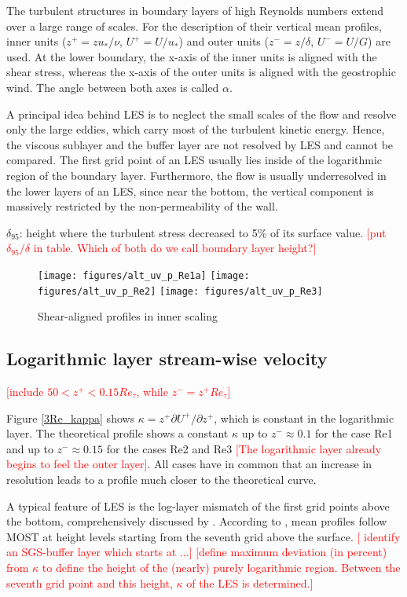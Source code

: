 \documentclass[a4paper,11pt]{article}
\newcommand{\todo}[1]{\textcolor{red}{$[$#1$]$}}
\begin{document}
The turbulent structures in boundary layers of high Reynolds numbers extend over a large range of scales. For the description of their vertical mean profiles, inner units ($z^+ = zu_*/\nu$, $U^+=U/u_*$) and outer units ($z^-=z/\delta$, $U^-=U/G$) are used. At the lower boundary, the x-axis of the inner units is aligned with the shear stress, whereas the x-axis of the outer units is aligned with the geostrophic wind. The angle between both axes is called $\alpha$.

A principal idea behind LES is to neglect the small scales of the flow and resolve only the large eddies, which carry most of the turbulent kinetic energy. Hence, the viscous sublayer and the buffer layer are not resolved by LES and cannot be compared. The first grid point of an LES usually lies inside of the logarithmic region of the boundary layer. Furthermore, the flow is usually underresolved in the lower layers of an LES, since near the bottom, the vertical component is massively restricted by the non-permeability of the wall.

$\delta_{95}$: height where the turbulent stress decreased to 5\% of its surface value. \todo{put $\delta_{95}/\delta$ in table. Which of both do we call boundary layer height?}

\begin{figure}
  \centerline{
	\texttt{[image: figures/alt\_uv\_p\_Re1a]}
	\texttt{[image: figures/alt\_uv\_p\_Re2]}
	\texttt{[image: figures/alt\_uv\_p\_Re3]}
}
  \caption{Shear-aligned profiles in inner scaling}
  \label{3Re_uv_p}
\end{figure}


\subsection{Logarithmic layer stream-wise velocity}

\todo{include $50<z^+<0.15Re_\tau$, while $z^-=z^+Re_\tau$}

Figure \ref{3Re_kappa} shows $\kappa = z^+\partial U^+/\partial z^+$, which is constant in the logarithmic layer. The theoretical profile shows a constant $\kappa$ up to $z^-\approx0.1$ for the case Re1 and up to $z^-\approx0.15$ for the cases Re2 and Re3 \todo{The logarithmic layer already begins to feel the outer layer}. All cases have in common that an increase in resolution leads to a profile much closer to the theoretical curve.

A typical feature of LES is the log-layer mismatch of the first grid points above the bottom, comprehensively discussed by \cite{brasseur2010designing}. According to \cite{maronga2020improved}, mean profiles follow MOST at height levels starting from the seventh grid above the surface. \todo{\citep{jiang2018large} identify an SGS-buffer layer which starts at ...} \todo{define maximum deviation (in percent) from $\kappa$ to define the height of the (nearly) purely logarithmic region. Between the seventh grid point and this height, $\kappa$ of the LES is determined.}
\end{document}
